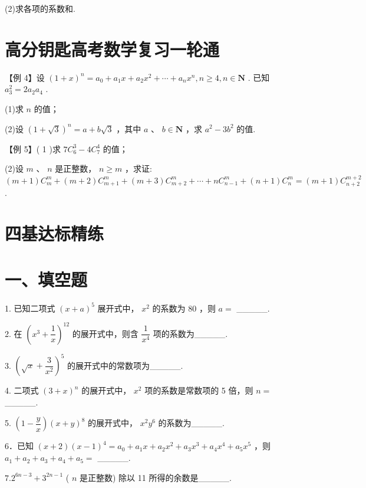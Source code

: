 (2)求各项的系数和.

\section*{高分钥匙高考数学复习一轮通}

【例 4】设 ${\left( 1 + x\right) }^{n} = {a}_{0} + {a}_{1}x + {a}_{2}{x}^{2} + \cdots  + {a}_{n}{x}^{n},n \geq  4,n \in  \mathbf{N}$ . 已知 ${a}_{3}^{2} = 2{a}_{2}{a}_{4}$ .

(1)求 $n$ 的值；

(2)设 ${\left( 1 + \sqrt{3}\right) }^{n} = a + b\sqrt{3}$ ，其中 $a$ 、 $b \in  \mathbf{N}$ ，求 ${a}^{2} - 3{b}^{2}$ 的值.

【例 5】( 1 )求 $7{{C}}_{6}^{3} - 4{{C}}_{7}^{4}$ 的值；

(2)设 $m$ 、 $n$ 是正整数， $n \geq  m$ ，求证: $\left( {m + 1}\right) {{C}}_{m}^{m} + \left( {m + 2}\right) {{C}}_{m + 1}^{m} + \left( {m + 3}\right) {{C}}_{m + 2}^{m} + \cdots  + n{{C}}_{n - 1}^{m} + \left( {n + 1}\right) {{C}}_{n}^{m}  = \left( {m + 1}\right) {{C}}_{n + 2}^{m + 2}$ .

\section*{四基达标精练}

\section*{一、填空题}

1. 已知二项式 ${\left( x + a\right) }^{5}$ 展开式中， ${x}^{2}$ 的系数为 80 ，则 $a =$ \_\_\_\_\_.

2. 在 ${\left( {x}^{3} + \dfrac{1}{x}\right) }^{12}$ 的展开式中，则含 $\dfrac{1}{{x}^{4}}$ 项的系数为\_\_\_\_\_.

3. ${\left( \sqrt{x} + \dfrac{3}{{x}^{2}}\right) }^{5}$ 的展开式中的常数项为\_\_\_\_\_.

4. 二项式 ${\left( 3 + x\right) }^{n}$ 的展开式中， ${x}^{2}$ 项的系数是常数项的 5 倍，则 $n =$ \_\_\_\_\_.

5. $\left( {1 - \dfrac{y}{x}}\right) {\left( x + y\right) }^{8}$ 的展开式中， ${x}^{2}{y}^{6}$ 的系数为\_\_\_\_\_.

6．已知 $\left( {x + 2}\right) {\left( x - 1\right) }^{4} = {a}_{0} + {a}_{1}x + {a}_{2}{x}^{2} + {a}_{3}{x}^{3} + {a}_{4}{x}^{4} + {a}_{5}{x}^{5}$ ，则 ${a}_{1} + {a}_{2} + {a}_{3} + {a}_{4} + {a}_{5} =$ \_\_\_\_\_.

${7.2}^{{6n} - 3} + {3}^{{2n} - 1}$ ( $n$ 是正整数) 除以 11 所得的余数是\_\_\_\_\_.

